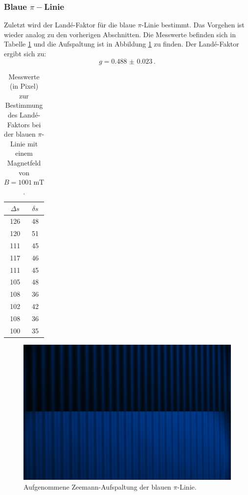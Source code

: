 \subsubsection{Blaue \texorpdfstring{$\pi-$}ALinie}
	Zuletzt wird der Landé-Faktor für die blaue $\pi$-Linie bestimmt. Das Vorgehen ist wieder
	analog zu den vorherigen Abschnitten.
	Die Messwerte befinden sich in Tabelle \ref{tab:blau_pi} und die Aufspaltung
	ist in Abbildung \ref{fig:blau_pi} zu finden.
	Der Landé-Faktor ergibt sich zu:
	\begin{equation*}
		g = \SI{0.488(23)} \, \text{.}
	\end{equation*}
	\begin{table}
		\centering
		\caption{Messwerte (in Pixel) zur Bestimmung des Landé-Faktors bei der blauen $\pi$-Linie mit einem Magnetfeld von $B = \SI{1001}{\milli\tesla}$.}
		\label{tab:blau_pi}
		\begin{tabular}{c | c}
			\toprule
			$\Delta s$ & $\delta s$\\
			\midrule
			126 & 48 \\
			120 & 51 \\
			111 & 45 \\
			117 & 46 \\
			111 & 45 \\
			105 & 48 \\
			108 & 36 \\
			102 & 42 \\
			108 & 36 \\
			100 & 35 \\
			\bottomrule
		\end{tabular}
	\end{table}
	\begin{figure}
	\centering
	\includegraphics[width=\textwidth]{ouurs/blau_pi_crop.png}
	\caption{Aufgenommene Zeemann-Aufspaltung der blauen $\pi$-Linie.}
	\label{fig:blau_pi}
\end{figure}

